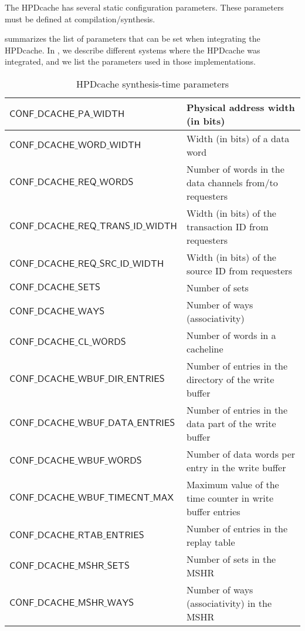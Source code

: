 \documentclass[10pt,titlepage,twoside]{book}
\begin{document}
The \ac{HPDcache} has several static configuration parameters.
These parameters must be defined at compilation/synthesis.

 summarizes the list of parameters that can be set when integrating the \ac{HPDcache}.
In , we describe different systems where the \ac{HPDcache} was integrated, and we list the parameters used in those implementations.

\begin{table}[h!]
\begin{center}
\caption{HPDcache synthesis-time parameters}%
{\footnotesize%
\begin{tabular}{p{}p{}}
\toprule%
$\mathsf{CONF\_DCACHE\_PA\_WIDTH}$ &%
Physical address width (in bits) \\
\midrule%
$\mathsf{CONF\_DCACHE\_WORD\_WIDTH}$ &%
Width (in bits) of a data word\\
\midrule%
$\mathsf{CONF\_DCACHE\_REQ\_WORDS}$ &%
Number of words in the data channels from/to requesters \\
\midrule%
$\mathsf{CONF\_DCACHE\_REQ\_TRANS\_ID\_WIDTH}$ &%
Width (in bits) of the transaction ID from requesters \\
\midrule%
$\mathsf{CONF\_DCACHE\_REQ\_SRC\_ID\_WIDTH}$ &%
Width (in bits) of the source ID from requesters \\
\midrule%
$\mathsf{CONF\_DCACHE\_SETS}$ &%
Number of sets \\
\midrule%
$\mathsf{CONF\_DCACHE\_WAYS}$ &%
Number of ways (associativity) \\
\midrule%
$\mathsf{CONF\_DCACHE\_CL\_WORDS}$ &%
Number of words in a cacheline\\
\midrule%
$\mathsf{CONF\_DCACHE\_WBUF\_DIR\_ENTRIES}$ &%
Number of entries in the directory of the write buffer \\
\midrule%
$\mathsf{CONF\_DCACHE\_WBUF\_DATA\_ENTRIES}$ &%
Number of entries in the data part of the write buffer \\
\midrule%
$\mathsf{CONF\_DCACHE\_WBUF\_WORDS}$ &%
Number of data words per entry in the write buffer \\
\midrule%
$\mathsf{CONF\_DCACHE\_WBUF\_TIMECNT\_MAX}$ &%
Maximum value of the time counter in write buffer entries \\
\midrule%
$\mathsf{CONF\_DCACHE\_RTAB\_ENTRIES}$ &%
Number of entries in the replay table \\
\midrule%
$\mathsf{CONF\_DCACHE\_MSHR\_SETS}$ &%
Number of sets in the \ac{MSHR} \\
\midrule%
$\mathsf{CONF\_DCACHE\_MSHR\_WAYS}$ &%
Number of ways (associativity) in the \ac{MSHR} \\
\end{tabular}}
\end{center}
\end{table}
\end{document}
